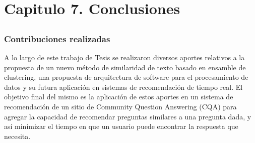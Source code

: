 \chapter*{Capitulo 7. \textbf{Conclusiones}}\label{ch:conclusiones}

\section*{}
\addtocounter{section}{1}
\setcounter{subsection}{0}

\subsection{Contribuciones realizadas}
A lo largo de este trabajo de Tesis se realizaron diversos aportes relativos a la propuesta de un nuevo método de similaridad de texto basado en ensamble de clustering, una propuesta de arquitectura de software para el procesamiento de datos y su futura aplicación en sistemas de recomendación de tiempo real. El objetivo final del mismo es la aplicación de estos aportes en un sistema de recomendación de un sitio de Community Question Answering (CQA) para agregar la capacidad de recomendar preguntas similares a una pregunta dada, y así minimizar el tiempo en que un usuario puede encontrar la respuesta que necesita.

